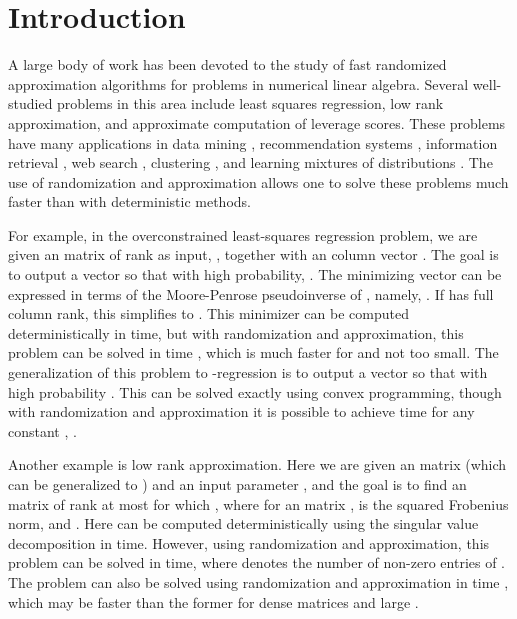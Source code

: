 \documentclass{sig-alternate}
\begin{document}
\ifSTOC
{}
\fi

\section{Introduction}
A large body of work has been devoted to the study of fast randomized 
approximation algorithms for problems in numerical linear algebra. Several well-studied
problems in this area include
least squares regression, low rank approximation, 
and approximate computation of leverage scores. These problems have many applications
in data mining \cite{afkms01}, recommendation systems \cite{dkr02}, 
information retrieval \cite{prtv00},
web search \cite{afkm01,k99}, clustering \cite{dfkvv04,m01}, and learning mixtures of distributions \cite{ksv08,am05}. 
The use of randomization
and approximation allows one to solve these problems much faster than with deterministic
methods. 

For example, in the overconstrained least-squares regression problem, we are given an 
matrix  of rank  as input, , together with an  column vector . The goal is to 
output a vector  so that with high probability, 
.
The minimizing vector  can be expressed in terms of the Moore-Penrose pseudoinverse  of , 
namely, . If  has full column rank, this simplifies to . 
This minimizer can be computed deterministically in  time, but
with randomization and approximation, 
this problem can be solved in  time \cite{s06,dmms11}, 
which is much faster for  and  not too small. The generalization of this problem
to -regression is to output a vector  so that with high probability
. This can be solved exactly using convex programming,
though with randomization and approximation it is possible to achieve 
time \cite{CDMMMW} for any constant , . 

Another example is low rank approximation. Here we are given an  matrix (which can
be generalized to ) and an input parameter , and the goal is to find
an  matrix  of rank at most  for which ,
where for an  matrix ,  is the
squared Frobenius norm, and .
Here  can be computed deterministically using the singular value decomposition in  time. 
However, using randomization and approximation, this problem can be solved in   time\cite{s06, cw09}, where   denotes the number of non-zero entries of . 
The problem can also be solved using randomization and approximation in
 time \cite{s06}, 
which may be faster than the former for dense matrices and large . 
\end{document}
